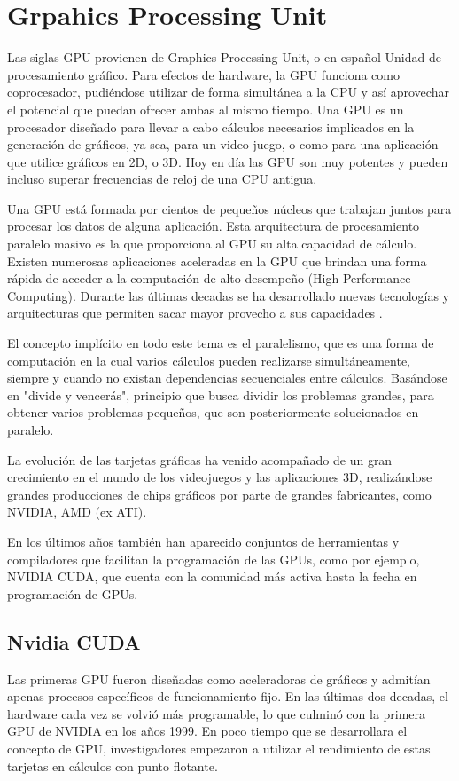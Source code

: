 \section{Grpahics Processing Unit}
Las siglas GPU provienen de Graphics Processing Unit, o en español Unidad de procesamiento gráfico. Para efectos de hardware, la GPU funciona como coprocesador,
pudiéndose utilizar de forma simultánea a la CPU y así aprovechar el potencial que puedan ofrecer ambas al mismo tiempo. Una GPU es un procesador
diseñado para llevar a cabo cálculos necesarios implicados en la generación de gráficos, ya sea, para un video juego, o como para una aplicación que utilice
gráficos en 2D, o 3D. Hoy en día las GPU son muy potentes y pueden incluso superar frecuencias de reloj de una CPU antigua.

Una GPU está formada por cientos de pequeños núcleos que trabajan juntos para procesar los datos de alguna aplicación. Esta arquitectura de procesamiento paralelo
masivo es la que proporciona al GPU su alta capacidad de cálculo. Existen numerosas aplicaciones aceleradas en la GPU que brindan una forma rápida de acceder
a la computación de alto desempeño (High Performance Computing). Durante las últimas decadas se ha desarrollado nuevas tecnologías y arquitecturas
que permiten sacar mayor provecho a sus capacidades \cite{owens2007gpu}.

El concepto implícito en todo este tema es el paralelismo, que es una forma de computación en la cual varios cálculos pueden realizarse simultáneamente,
siempre y cuando no existan dependencias secuenciales entre cálculos. Basándose en "divide y vencerás", principio que busca dividir los problemas grandes, para
obtener varios problemas pequeños, que son posteriormente solucionados en paralelo.

La evolución de las tarjetas gráficas ha venido acompañado de un gran crecimiento en el mundo de los videojuegos y las aplicaciones 3D, realizándose grandes
producciones de chips gráficos por parte de grandes fabricantes, como NVIDIA, AMD (ex ATI).

En los últimos años también han aparecido conjuntos de herramientas y compiladores que facilitan la programación de las GPUs, como por ejemplo, NVIDIA CUDA, que
cuenta con la comunidad más activa hasta la fecha en programación de GPUs.

\subsection{Nvidia CUDA}
Las primeras GPU fueron diseñadas como aceleradoras de gráficos y admitían apenas procesos específicos de funcionamiento fijo. En las últimas dos decadas,
el hardware cada vez se volvió más programable, lo que culminó con la primera GPU de NVIDIA en los años 1999. En poco tiempo que se desarrollara el concepto de GPU,
investigadores empezaron a utilizar el rendimiento de estas tarjetas en cálculos con punto flotante.

